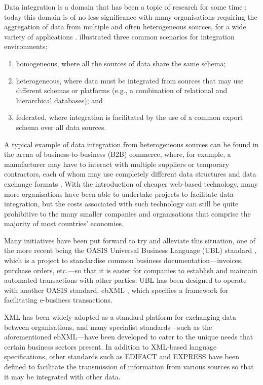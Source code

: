 \documentclass{CRPITStyle}
\begin{document}
Data integration is a domain that has been a topic of research for some
time \cite{Beck-R-2002-Bled,Wied-G-1993-SIGMOD}; today this domain is of
no less significance with many organisations requiring the aggregation
of data from multiple and often heterogeneous sources, for a wide
variety of applications \cite{Haas-LM-1999-DEB}.
 illustrated three common scenarios for
integration environments:

\begin{enumerate}

	\item homogeneous, where all the sources of data share the same
	schema;

	\item heterogeneous, where data must be integrated from sources that
	may use different schemas or platforms (e.g., a combination of
	relational and hierarchical databases); and

	\item federated, where integration is facilitated by the use of a
	common export schema over all data sources.

\end{enumerate}

A typical example of data integration from heterogeneous sources can be
found in the arena of business-to-business (B2B) commerce, where, for
example, a manufacturer may have to interact with multiple suppliers or
temporary contractors, each of whom may use completely different data
structures and data exchange formats \cite{Ston-M-2001-SIGMOD}. With the
introduction of cheaper web-based technology, many more organisations
have been able to undertake projects to facilitate data integration, but
the costs associated with such technology can still be quite prohibitive
to the many smaller companies and organisations that comprise the
majority of most countries' economies.

Many initiatives have been put forward to try and alleviate this
situation, one of the more recent being the OASIS Universal Business
Language (UBL) standard \cite{Mead-B-2004-UBL}, which is a project to
standardise common business documentation---invoices, purchase orders,
etc.---so that it is easier for companies to establish and maintain
automated transactions with other parties. UBL has been designed to
operate with another OASIS standard, ebXML \cite{Eise-B-2001-ebXML},
which specifies a framework for facilitating e-business transactions.

XML has been widely adopted as a standard platform for exchanging data
between organisations, and many specialist standards---such as the
aforementioned ebXML---have been developed to cater to the unique needs
that certain business sectors present. In addition to XML-based language
specifications, other standards such as EDIFACT and EXPRESS have been
defined to facilitate the transmission of information from various
sources so that it may be integrated with other data.
\end{document}
